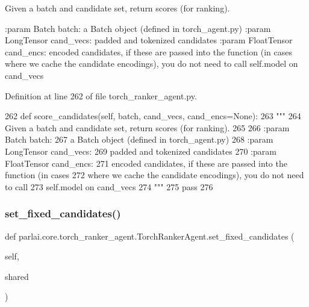 \begin{DoxyVerb}Given a batch and candidate set, return scores (for ranking).

:param Batch batch:
    a Batch object (defined in torch_agent.py)
:param LongTensor cand_vecs:
    padded and tokenized candidates
:param FloatTensor cand_encs:
    encoded candidates, if these are passed into the function (in cases
    where we cache the candidate encodings), you do not need to call
    self.model on cand_vecs
\end{DoxyVerb}
 

Definition at line 262 of file torch\+\_\+ranker\+\_\+agent.\+py.


\begin{DoxyCode}
262     \textcolor{keyword}{def }score\_candidates(self, batch, cand\_vecs, cand\_encs=None):
263         \textcolor{stringliteral}{"""}
264 \textcolor{stringliteral}{        Given a batch and candidate set, return scores (for ranking).}
265 \textcolor{stringliteral}{}
266 \textcolor{stringliteral}{        :param Batch batch:}
267 \textcolor{stringliteral}{            a Batch object (defined in torch\_agent.py)}
268 \textcolor{stringliteral}{        :param LongTensor cand\_vecs:}
269 \textcolor{stringliteral}{            padded and tokenized candidates}
270 \textcolor{stringliteral}{        :param FloatTensor cand\_encs:}
271 \textcolor{stringliteral}{            encoded candidates, if these are passed into the function (in cases}
272 \textcolor{stringliteral}{            where we cache the candidate encodings), you do not need to call}
273 \textcolor{stringliteral}{            self.model on cand\_vecs}
274 \textcolor{stringliteral}{        """}
275         \textcolor{keywordflow}{pass}
276 
\end{DoxyCode}
\mbox{\label{classparlai_1_1core_1_1torch__ranker__agent_1_1TorchRankerAgent_a9039757596f98b45b6676b16589883a3}} 
\subsubsection{\texorpdfstring{set\+\_\+fixed\+\_\+candidates()}{set\_fixed\_candidates()}}
{\footnotesize\ttfamily def parlai.\+core.\+torch\+\_\+ranker\+\_\+agent.\+Torch\+Ranker\+Agent.\+set\+\_\+fixed\+\_\+candidates (\begin{DoxyParamCaption}\item[{}]{self,  }\item[{}]{shared }\end{DoxyParamCaption})}

